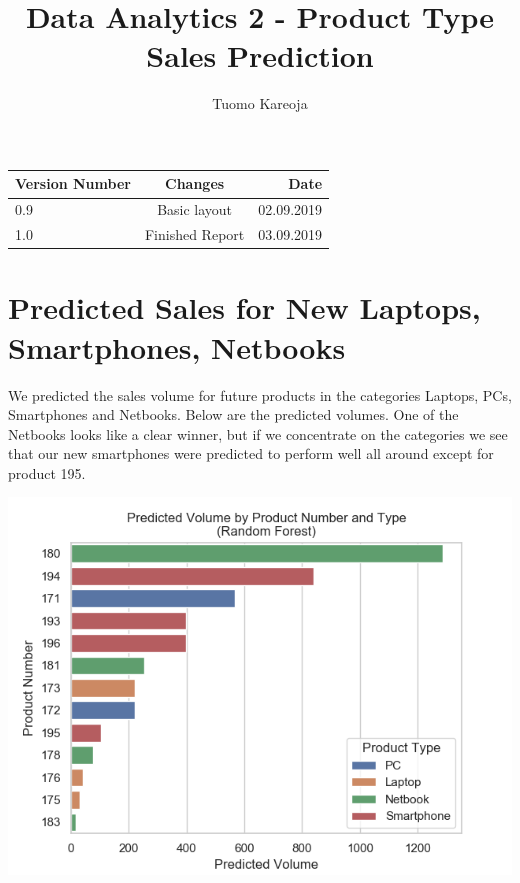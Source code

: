 \documentclass[12pt,a4paper,leqno]{report}
\title{Data Analytics 2 - Product Type Sales Prediction}
\author{Tuomo Kareoja}
\date{}
\theoremstyle{plain}
\theoremstyle{definition}
\theoremstyle{remark}
\begin{document}
\maketitle

\begin{table}[h!]
  \begin{center}
    \begin{tabular}{l|c|r}
      \textbf{Version Number} & \textbf{Changes} & \textbf{Date} \\
      \hline
      0.9 & Basic layout & 02.09.2019\\
      1.0 & Finished Report & 03.09.2019\\
    \end{tabular}
  \end{center}
\end{table}

\newpage

\section{Predicted Sales for New Laptops, Smartphones, Netbooks}

We predicted the sales volume for future products in the categories Laptops,
PCs, Smartphones and Netbooks. Below are the predicted volumes. One of the Netbooks
looks like a clear winner, but if we concentrate on the categories we see that
our new smartphones were predicted to perform well all around except for product 195.

\bigskip
{
    \centering
    \includegraphics[width=\textwidth,height=\textheight,keepaspectratio]{predicted_volume_rf.png}
    \par
}
\bigskip
\end{document}
